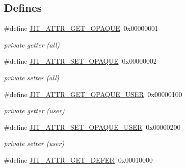 \subsection*{Defines}
\begin{DoxyCompactItemize}
\item 
\hypertarget{group__jitter_gaad15de144710f76f17f8f79442c1ee13}{
\#define \hyperlink{group__jitter_gaad15de144710f76f17f8f79442c1ee13}{JIT\_\-ATTR\_\-GET\_\-OPAQUE}~0x00000001}
\label{group__jitter_gaad15de144710f76f17f8f79442c1ee13}

\begin{DoxyCompactList}\small\item\em private getter (all) \item\end{DoxyCompactList}\item 
\hypertarget{group__jitter_gae7eacda8a8da4e67c363ccc33c46b6d1}{
\#define \hyperlink{group__jitter_gae7eacda8a8da4e67c363ccc33c46b6d1}{JIT\_\-ATTR\_\-SET\_\-OPAQUE}~0x00000002}
\label{group__jitter_gae7eacda8a8da4e67c363ccc33c46b6d1}

\begin{DoxyCompactList}\small\item\em private setter (all) \item\end{DoxyCompactList}\item 
\hypertarget{group__jitter_ga9c73a749fbf9f581b85e8ecf9a875b91}{
\#define \hyperlink{group__jitter_ga9c73a749fbf9f581b85e8ecf9a875b91}{JIT\_\-ATTR\_\-GET\_\-OPAQUE\_\-USER}~0x00000100}
\label{group__jitter_ga9c73a749fbf9f581b85e8ecf9a875b91}

\begin{DoxyCompactList}\small\item\em private getter (user) \item\end{DoxyCompactList}\item 
\hypertarget{group__jitter_gae998edfcacc5675e80f85d499453ea23}{
\#define \hyperlink{group__jitter_gae998edfcacc5675e80f85d499453ea23}{JIT\_\-ATTR\_\-SET\_\-OPAQUE\_\-USER}~0x00000200}
\label{group__jitter_gae998edfcacc5675e80f85d499453ea23}

\begin{DoxyCompactList}\small\item\em private setter (user) \item\end{DoxyCompactList}\item 
\hypertarget{group__jitter_ga13c8aa5f90991dad82d1d4dcc3623223}{
\#define \hyperlink{group__jitter_ga13c8aa5f90991dad82d1d4dcc3623223}{JIT\_\-ATTR\_\-GET\_\-DEFER}~0x00010000}
\label{group__jitter_ga13c8aa5f90991dad82d1d4dcc3623223}


\end{DoxyCompactItemize}
